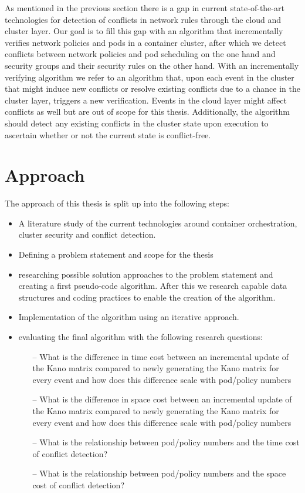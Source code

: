 As mentioned in the previous section there is a gap in current state-of-the-art technologies for detection of conflicts in network rules through the cloud and cluster layer. Our goal is to fill this gap with an algorithm that incrementally verifies network policies and pods in a container cluster, after which we detect conflicts between network policies and pod scheduling on the one hand and security groups and their security rules on the other hand. With an incrementally verifying algorithm we refer to an algorithm that, upon each event in the cluster that might induce new conflicts or resolve existing conflicts due to a chance in the cluster layer, triggers a new verification. Events in the cloud layer might affect conflicts as well but are out of scope for this thesis. Additionally, the algorithm should detect any existing conflicts in the cluster state upon execution to ascertain whether or not the current state is conflict-free.



\section{Approach } \label{sec:approach}
The approach of this thesis is split up into the following steps:
\begin{itemize}
    \renewcommand{\labelitemi}{\scriptsize$\blacksquare$}
     \item A literature study of the current technologies around container orchestration, cluster security and conflict detection.
    \item Defining a problem statement and scope for the thesis
    \item researching possible solution approaches to the problem statement and creating a first pseudo-code algorithm. After this we research capable data structures and coding practices to enable the creation of the algorithm.
    \item Implementation of the algorithm using an iterative approach.
    \item evaluating the final algorithm with the following research questions:

    \begin{enumerate}
        \item[--] What is the difference in time cost between an incremental update of the Kano matrix compared to newly generating the Kano matrix for every event and how does this difference scale with pod/policy numbers
        \item[--] What is the difference in space cost between an incremental update of the Kano matrix compared to newly generating the Kano matrix for every event and how does this difference scale with pod/policy numbers
        \item[--] What is the relationship between pod/policy numbers and the time cost of conflict detection?
        \item[--] What is the relationship between pod/policy numbers and the space cost of conflict detection?
    \end{enumerate}
\end{itemize}


